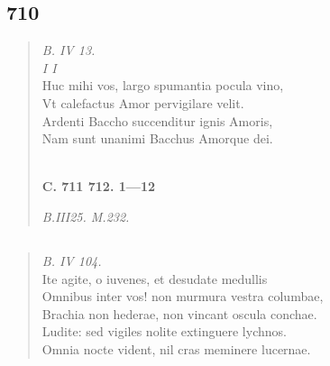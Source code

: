 \documentclass[11pt, a4paper]{report}
\begin{document}
            \subsection*{710}
      \begin{verse}
      \textit{B. IV 13.} \\ \textit{I I} \\ Huc mihi vos, largo spumantia pocula vino, \\ Vt calefactus Amor pervigilare velit. \\ Ardenti Baccho succenditur ignis Amoris, \\ Nam sunt unanimi Bacchus Amorque dei. \\ 
        ﻿\pagebreak 
     \marginpar{[176]} \begin{center} \textbf{C. 711 712. 1—12} \end{center}\textit{B.III25. M.232.} \\ 
      \end{verse}
  
            \subsection*{}
      \begin{verse}
      \textit{B. IV 104.} \\ Ite agite, o iuvenes, et desudate medullis \\ Omnibus inter vos! non murmura vestra columbae, \\ Brachia non hederae, non vincant oscula conchae. \\ Ludite: sed vigiles nolite extinguere lychnos. \\ Omnia nocte vident, nil cras meminere lucernae. \\ 
      \end{verse}
  
\end{document}
